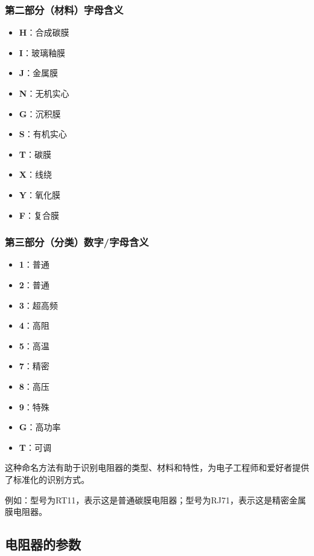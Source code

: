 \documentclass[12pt,UTF8]{ctexbook}
\begin{document}
\subsubsection{第二部分（材料）字母含义}

\begin{itemize}[leftmargin=2cm]
	\item \textbf{H}：合成碳膜
	\item \textbf{I}：玻璃釉膜
	\item \textbf{J}：金属膜
	\item \textbf{N}：无机实心
	\item \textbf{G}：沉积膜
	\item \textbf{S}：有机实心
	\item \textbf{T}：碳膜
	\item \textbf{X}：线绕
	\item \textbf{Y}：氧化膜
	\item \textbf{F}：复合膜
\end{itemize}

\subsubsection{第三部分（分类）数字/字母含义}

\begin{itemize}[leftmargin=2cm]
	\item \textbf{1}：普通
	\item \textbf{2}：普通
	\item \textbf{3}：超高频
	\item \textbf{4}：高阻
	\item \textbf{5}：高温
	\item \textbf{7}：精密
	\item \textbf{8}：高压
	\item \textbf{9}：特殊
	\item \textbf{G}：高功率
	\item \textbf{T}：可调
\end{itemize}

这种命名方法有助于识别电阻器的类型、材料和特性，为电子工程师和爱好者提供了标准化的识别方式。

例如：型号为RT11，表示这是普通碳膜电阻器；型号为RJ71，表示这是精密金属膜电阻器。

\subsection{电阻器的参数}
\end{document}
